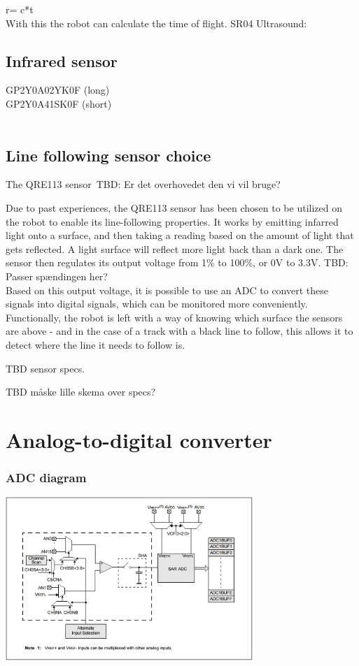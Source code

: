 r= c*t\\

With this the robot can calculate the time of flight.
SR04 Ultrasound:\\

\subsection{Infrared sensor}

GP2Y0A02YK0F (long) \\	
GP2Y0A41SK0F (short) \\
\\
\subsection{Line following sensor choice} 

The QRE113 sensor\
TBD: Er det overhovedet den vi vil bruge?\

Due to past experiences, the QRE113 sensor has been chosen to be utilized on the robot to enable its line-following properties. It works by emitting infarred light onto a surface, and then taking a reading based on the amount of light that gets reflected. A light surface will reflect more light back than a dark one. The sensor then regulates its output voltage from 1\% to 100\%, or 0V to 3.3V. TBD: Passer spændingen her?\\ Based on this output voltage, it is possible to use an ADC to convert these signals into digital signals, which can be monitored more conveniently. Functionally, the robot is left with a way of knowing which surface the sensors are above - and in the case of a track with a black line to follow, this allows it to detect where the line it needs to follow is.\

TBD sensor specs.\

TBD måske lille skema over specs?

\section{Analog-to-digital converter}


\subsubsection{ADC diagram} 

\includegraphics[width=0.7\textwidth]{figures/adcblock.PNG}


